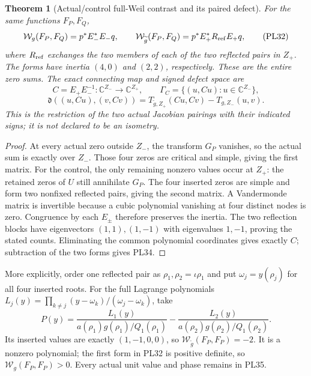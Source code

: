 \documentclass[11pt,a4paper]{article}
\newtheorem{theorem}{Theorem}[section]
\theoremstyle{definition}\newtheorem{definition}[theorem]{Definition}
\newcommand{\C}{\mathbb C}\newcommand{\R}{\mathbb R}
\begin{document}
\begin{theorem}[Actual/control full-Weil contrast and its paired defect]
\label{pl:thm:contrast}
For the same functions \(F_P,F_Q\),
\[
 \mathcal W_g(F_P,F_Q)=p^*E_-^*E_-q,\qquad
 \mathcal W_{\widetilde g}(F_P,F_Q)=p^*E_+^*R_{\rm ref}E_+q,
 \tag{PL32}\label{pl:pl:contrast}
\]
where \(R_{\rm ref}\) exchanges the two members of each of the two
reflected pairs in \(Z_+\). The forms have inertia \((4,0)\) and
\((2,2)\), respectively. These are the entire zero sums.
The exact connecting map and signed defect space are
\[
 C=E_+E_-^{-1}:\C^{Z_-}\longrightarrow\C^{Z_+},\qquad
 \Gamma_C=\{(u,Cu):u\in\C^{Z_-}\},
 \tag{PL33}
\]
\[
 \mathfrak d((u,Cu),(v,Cv))
       =T_{\widetilde g,Z_+}(Cu,Cv)-T_{g,Z_-}(u,v).
 \tag{PL34}\label{pl:pl:paired-defect}
\]
This is the restriction of the two actual Jacobian pairings with
their indicated signs; it is not declared to be an isometry.
\end{theorem}
\begin{proof}
At every actual zero outside \(Z_-\), the transform \(G_P\)
vanishes, so the actual sum is exactly over \(Z_-\).
Those four zeros are critical and simple, giving the first matrix.
For the control, the only remaining nonzero values occur at \(Z_+\):
the retained zeros of \(U\) still annihilate \(G_P\).
The four inserted zeros are simple and form two nonfixed reflected
pairs, giving the second matrix. A Vandermonde matrix is invertible
because a cubic polynomial vanishing at four distinct nodes is zero.
Congruence by each \(E_\pm\) therefore preserves the inertia.
The two reflection blocks have eigenvectors \((1,1),(1,-1)\)
with eigenvalues \(1,-1\), proving the stated counts.
Eliminating the common polynomial coordinates gives exactly \(C\);
subtraction of the two forms gives PL34.
\end{proof}

More explicitly, order one reflected pair as \(\rho_1,\rho_2=\iota\rho_1\)
and put \(\omega_j=y(\rho_j)\) for all four inserted roots.
For the full Lagrange polynomials
\(L_j(y)=\prod_{k\ne j}(y-\omega_k)/(\omega_j-\omega_k)\), take
\[
 P(y)=\frac{L_1(y)}{a(\rho_1)g(\rho_1)/Q_1(\rho_1)}
      -\frac{L_2(y)}{a(\rho_2)g(\rho_2)/Q_1(\rho_2)}.
 \tag{PL35}\label{pl:pl:negative}
\]
Its inserted values are exactly \((1,-1,0,0)\), so
\(\mathcal W_{\widetilde g}(F_P,F_P)=-2\).
It is a nonzero polynomial; the first form in PL32 is positive
definite, so \(\mathcal W_g(F_P,F_P)>0\).
Every actual unit value and phase remains in PL35.
\end{document}
